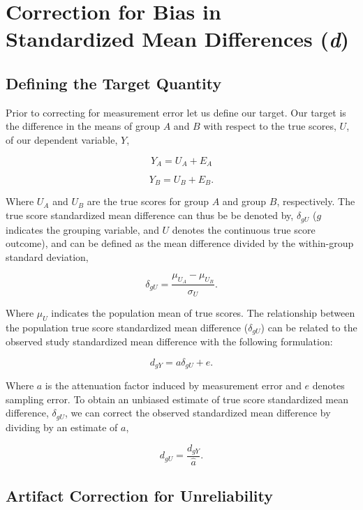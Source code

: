 \documentclass[
  letterpaper,
  DIV=11,
  numbers=noendperiod]{scrreprt}
\begin{document}
\hypertarget{correction-for-bias-in-standardized-mean-differences-d}{%
\section{\texorpdfstring{Correction for Bias in Standardized Mean
Differences
(\emph{d})}{Correction for Bias in Standardized Mean Differences (d)}}\label{correction-for-bias-in-standardized-mean-differences-d}}

\hypertarget{defining-the-target-quantity-2}{%
\subsection{Defining the Target
Quantity}\label{defining-the-target-quantity-2}}

Prior to correcting for measurement error let us define our target. Our
target is the difference in the means of group \(A\) and \(B\) with
respect to the true scores, \(U\), of our dependent variable, \(Y\),

\[
Y_A = U_A + E_A
\]

\[
Y_B = U_B + E_B.
\]

Where \(U_A\) and \(U_B\) are the true scores for group \(A\) and group
\(B\), respectively. The true score standardized mean difference can
thus be be denoted by, \(\delta_{gU}\) (\(g\) indicates the grouping
variable, and \(U\) denotes the continuous true score outcome), and can
be defined as the mean difference divided by the within-group standard
deviation,

\[
\delta_{gU} = \frac{\mu_{U_A} - \mu_{U_B}}{\sigma_{U}}.
\]

Where \(\mu_U\) indicates the population mean of true scores. The
relationship between the population true score standardized mean
difference (\(\delta_{gU}\)) can be related to the observed study
standardized mean difference with the following formulation:

\[
d_{gY} = a\delta_{gU}+e.
\]

Where \(a\) is the attenuation factor induced by measurement error and
\(e\) denotes sampling error. To obtain an unbiased estimate of true
score standardized mean difference, \(\delta_{gU}\), we can correct the
observed standardized mean difference by dividing by an estimate of
\(a\),

\[
d_{gU} = \frac{d_{gY}}{\hat{a}}.
\]

\hypertarget{sec-d-SMD}{%
\subsection{Artifact Correction for Unreliability}\label{sec-d-SMD}}
\end{document}
